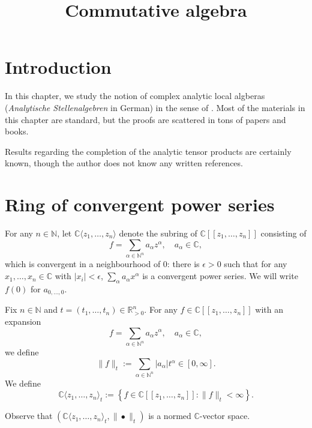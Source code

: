 






\title{Commutative algebra}






%

\maketitle


\tableofcontents


\section{Introduction}

In this chapter, we study the notion of complex analytic local algberas (\emph{Analytische Stellenalgebren} in German) in the sense of \cite{GR71}. Most of the materials in this chapter are standard, but the proofs are scattered in tons of papers and books.

Results regarding the completion of the analytic tensor products are certainly known, though the author does not know any written references.
\section{Ring of convergent power series}

\begin{definition}\label{def-ringconvpowerseries}
    For any $n\in \mathbb{N}$, let $\mathbb{C}\langle z_1,\ldots,z_n\rangle$ denote the subring of $\mathbb{C}[[z_1,\ldots,z_n]]$ consisting of
    \[
        f=\sum_{\alpha\in \mathbb{N}^n} a_{\alpha}z^{\alpha},\quad a_{\alpha}\in \mathbb{C},
    \]
    which is  convergent in a neighbourhood of $0$: there is $\epsilon>0$ such that for any $x_1,\ldots,x_n\in \mathbb{C}$ with $|x_i|<\epsilon$, $\sum_{\alpha}a_{\alpha} x^{\alpha}$ is a convergent power series. We will write $f(0)$ for $a_{0,\ldots,0}$.
\end{definition}

\begin{definition}
    Fix $n\in \mathbb{N}$ and $t=(t_1,\ldots,t_n)\in \mathbb{R}_{> 0}^n$. For any $f\in \mathbb{C}[[z_1,\ldots,z_n]]$ with an expansion
    \[
        f=\sum_{\alpha\in \mathbb{N}^n} a_{\alpha}z^{\alpha},\quad a_{\alpha}\in \mathbb{C},  
    \]
    we define
    \[
        \|f\|_t:=\sum_{\alpha\in \mathbb{N}^n} |a_{\alpha}| t^{\alpha}\in [0,\infty].
    \]
    We define
    \[
        \mathbb{C}\langle z_1,\ldots,z_n\rangle_t:=\left\{f\in \mathbb{C}[[z_1,\ldots,z_n]]: \|f\|_t<\infty \right\}.
    \]
\end{definition}
Observe that $(\mathbb{C}\langle z_1,\ldots,z_n\rangle_t,\|\bullet\|_t)$ is a normed $\mathbb{C}$-vector space.

